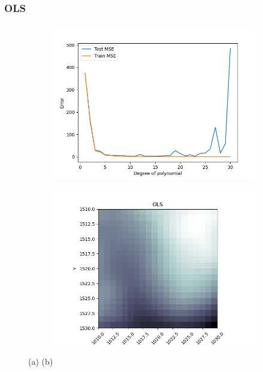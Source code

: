 \documentclass[../main.tex]{subfiles}
\begin{document}
\subsubsection{OLS}
\begin{figure}[htb] 
   \centering
   \begin{subfigure}[b]{0.45\textwidth}
    \centering
    \includegraphics[width=\textwidth]{../assets/terrain_ols_error_plot.png} 
    \caption{}
    
   \end{subfigure}
   \quad
   \begin{subfigure}[b]{0.45\textwidth}
    \centering
    \includegraphics[width=\textwidth]{../assets/Terrain_OLS_bestdegree.png} 
    \caption{}
   \end{subfigure}
   \caption{(a) (b) 
   }
   \label{fig:terrain-OLS}
\end{figure} 
\end{document}
